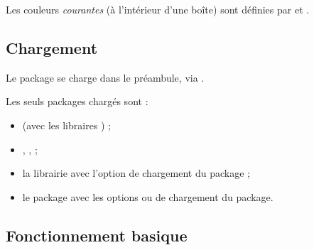 \documentclass[french,11pt,a4paper]{article}
\begin{document}
Les couleurs \textit{courantes} (à l'intérieur d'une boîte) sont définies par  et .

\subsection{Chargement}

Le package se charge dans le préambule, via .

Les seuls packages chargés sont :

\begin{itemize}
	\item {} (avec les libraires ) ;
	\item {}, ,  ;%
	\item la librairie  avec l'option \MontreCode{[breakable]} de chargement du package ;
	\item le package  avec les options \MontreCode{[ulem]} ou \MontreCode{[normalulem]} de chargement du package.
\end{itemize}

\begin{codehigh}[language=latex/latex2,style/main=cyan!10,style/code=cyan!10]
\usepackage{CreationBoites}                    %
\usepackage[nonfa]{CreationBoites}             %
\usepackage[fa6]{CreationBoites}               %
\usepackage[fa7]{CreationBoites}               %
\end{codehigh}

\begin{codehigh}[language=latex/latex2,style/main=cyan!10,style/code=cyan!10]
\usepackage[breakable]{CreationBoites}         %
\end{codehigh}

\begin{codehigh}[language=latex/latex2,style/main=cyan!10,style/code=cyan!10]
\usepackage[ulem]{CreationBoites}              %
\usepackage[normalulem]{CreationBoites}        %
\end{codehigh}

\pagebreak

\subsection{Fonctionnement basique}
\end{document}
